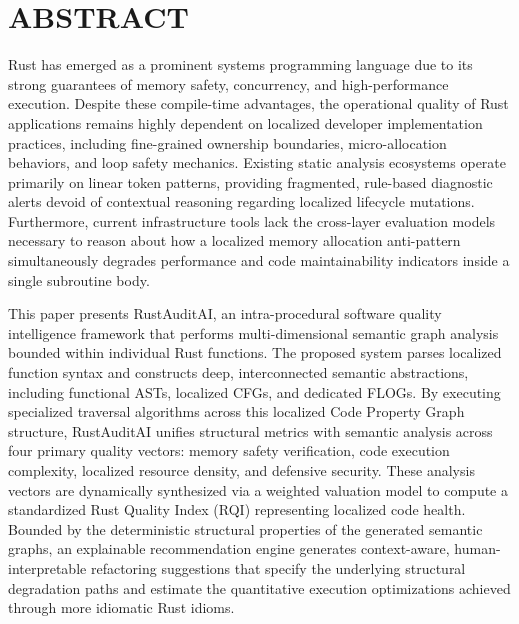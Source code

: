 \chapter*{\rm \large \bf ABSTRACT}
\vspace{3.0mm}
\begin{justify}

\hspace{0.5cm}Rust has emerged as a prominent systems programming language due to its strong guarantees of memory safety, concurrency, and high-performance execution. Despite these compile-time advantages, the operational quality of Rust applications remains highly dependent on localized developer implementation practices, including fine-grained ownership boundaries, micro-allocation behaviors, and loop safety mechanics. Existing static analysis ecosystems operate primarily on linear token patterns, providing fragmented, rule-based diagnostic alerts devoid of contextual reasoning regarding localized lifecycle mutations. Furthermore, current infrastructure tools lack the cross-layer evaluation models necessary to reason about how a localized memory allocation anti-pattern simultaneously degrades performance and code maintainability indicators inside a single subroutine body.
\par This paper presents RustAuditAI, an intra-procedural software quality intelligence framework that performs multi-dimensional semantic graph analysis bounded within individual Rust functions. The proposed system parses localized function syntax and constructs deep, interconnected semantic abstractions, including functional ASTs, localized CFGs, and dedicated FLOGs. By executing specialized traversal algorithms across this localized Code Property Graph structure, RustAuditAI unifies structural metrics with semantic analysis across four primary quality vectors: memory safety verification, code execution complexity, localized resource density, and defensive security. These analysis vectors are dynamically synthesized via a weighted valuation model to compute a standardized Rust Quality Index (RQI) representing localized code health. Bounded by the deterministic structural properties of the generated semantic graphs, an explainable recommendation engine generates context-aware, human-interpretable refactoring suggestions that specify the underlying structural degradation paths and estimate the quantitative execution optimizations achieved through more idiomatic Rust idioms.
\end{justify}